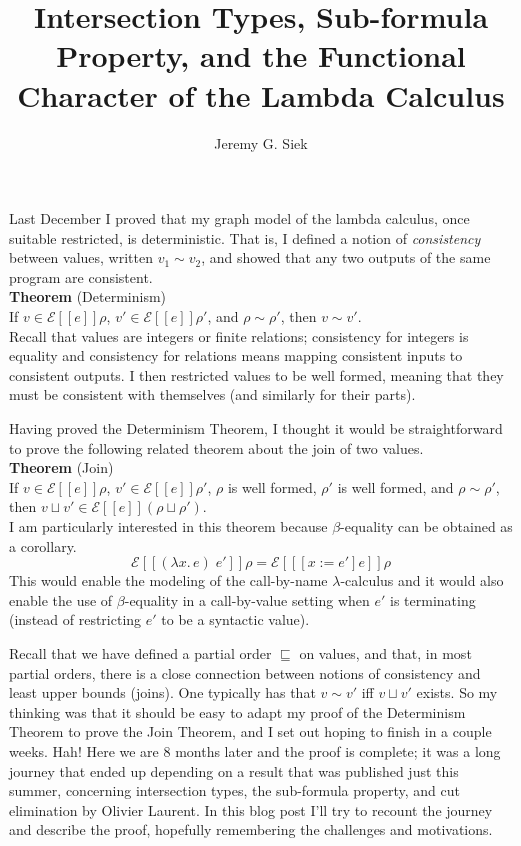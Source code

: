 \documentclass{article}
\title{Intersection Types, Sub-formula Property, and the Functional
  Character of the Lambda Calculus}
\author{Jeremy G. Siek}
\newcommand{\lam}[1]{\lambda #1.\,}
\newcommand{\app}[0]{\;}
\newcommand{\SEM}[1]{[\![ #1 ]\!]}
\newcommand{\ESEM}[1]{\mathcal{E}\SEM{#1}}
\begin{document}
\maketitle

Last December I proved that my graph model of the lambda calculus,
once suitable restricted, is deterministic. That is, I defined a
notion of \emph{consistency} between values, written $v_1 \sim v_2$,
and showed that any two outputs of the same program are consistent. \\

\noindent \textbf{Theorem} (Determinism)\\
  If $v \in \ESEM{e}\rho$, $v' \in \ESEM{e}\rho'$, and $\rho \sim
  \rho'$, then $v \sim v'$. \\

\noindent Recall that values are integers or finite relations;
consistency for integers is equality and consistency for relations
means mapping consistent inputs to consistent outputs. I then
restricted values to be well formed, meaning that they must be
consistent with themselves (and similarly for their parts).


Having proved the Determinism Theorem, I thought it would be
straightforward to prove the following related theorem about the join
of two values. \\

\noindent \textbf{Theorem} (Join)\\
If $v \in \ESEM{e}\rho$, $v' \in \ESEM{e}\rho'$,
$\rho$ is well formed, $\rho'$ is well formed,
and $\rho \sim \rho'$, \\
then $v \sqcup v' \in \ESEM{e}(\rho\sqcup\rho')$. \\

I am particularly interested in this theorem because $\beta$-equality
can be obtained as a corollary.
\[
\ESEM{(\lam{x}e)\app e'}\rho = \ESEM{[x{:=}e']e}\rho
\]
This would enable the modeling of the call-by-name $\lambda$-calculus
and it would also enable the use of $\beta$-equality in a
call-by-value setting when $e'$ is terminating (instead of restricting
$e'$ to be a syntactic value).


Recall that we have defined a partial order $\sqsubseteq$ on values,
and that, in most partial orders, there is a close connection between
notions of consistency and least upper bounds (joins). One typically
has that $v \sim v'$ iff $v \sqcup v'$ exists. So my thinking was that
it should be easy to adapt my proof of the Determinism Theorem to
prove the Join Theorem, and I set out hoping to finish in a couple
weeks. Hah! Here we are 8 months later and the proof is complete; it
was a long journey that ended up depending on a result that was
published just this summer, concerning intersection types, the
sub-formula property, and cut elimination by Olivier Laurent. In this
blog post I'll try to recount the journey and describe the proof,
hopefully remembering the challenges and motivations.
\end{document}
